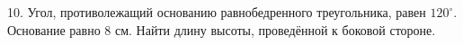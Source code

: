 10. Угол, противолежащий основанию равнобедренного треугольника, равен $120^\circ.$ Основание равно 8 см. Найти длину высоты, проведённой к боковой стороне.\\
